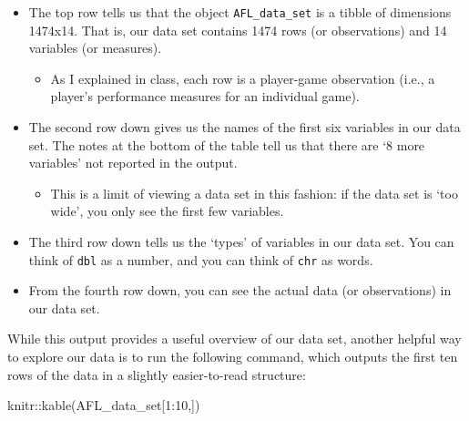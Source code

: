 \documentclass[
]{article}
\newenvironment{Shaded}{\begin{snugshade}}{\end{snugshade}}
\newcommand{\DecValTok}[1]{\textcolor[rgb]{0.00,0.00,0.81}{#1}}
\newcommand{\FunctionTok}[1]{\textcolor[rgb]{0.00,0.00,0.00}{#1}}
\newcommand{\NormalTok}[1]{#1}
\newcommand{\SpecialCharTok}[1]{\textcolor[rgb]{0.00,0.00,0.00}{#1}}
\providecommand{\tightlist}{%
  \setlength{\itemsep}{0pt}\setlength{\parskip}{0pt}}
\begin{document}
\begin{itemize}
\tightlist
\item
  The top row tells us that the object \texttt{AFL\_data\_set} is a
  tibble of dimensions 1474x14. That is, our data set contains 1474 rows
  (or observations) and 14 variables (or measures).

  \begin{itemize}
  \tightlist
  \item
    As I explained in class, each row is a player-game observation
    (i.e., a player's performance measures for an individual game).
  \end{itemize}
\item
  The second row down gives us the names of the first six variables in
  our data set. The notes at the bottom of the table tell us that there
  are `8 more variables' not reported in the output.

  \begin{itemize}
  \tightlist
  \item
    This is a limit of viewing a data set in this fashion: if the data
    set is `too wide', you only see the first few variables.
  \end{itemize}
\item
  The third row down tells us the `types' of variables in our data set.
  You can think of \texttt{dbl} as a number, and you can think of
  \texttt{chr} as words.
\item
  From the fourth row down, you can see the actual data (or
  observations) in our data set.
\end{itemize}

While this output provides a useful overview of our data set, another
helpful way to explore our data is to run the following command, which
outputs the first ten rows of the data in a slightly easier-to-read
structure:

\begin{Shaded}
\begin{Highlighting}[]
\NormalTok{knitr}\SpecialCharTok{::}\FunctionTok{kable}\NormalTok{(AFL\_data\_set[}\DecValTok{1}\SpecialCharTok{:}\DecValTok{10}\NormalTok{,])}
\end{Highlighting}
\end{Shaded}
\end{document}
